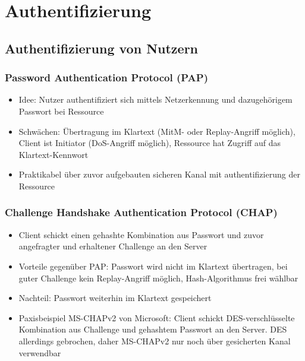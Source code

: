 \section{Authentifizierung}

\subsection{Authentifizierung von Nutzern}

\subsubsection{Password Authentication Protocol (PAP)}
\begin{itemize}
	\item Idee: Nutzer authentifiziert sich mittels Netzerkennung und dazugehörigem Passwort bei Ressource
	\item Schwächen: Übertragung im Klartext (MitM- oder Replay-Angriff möglich), Client ist Initiator (DoS-Angriff möglich), Ressource hat Zugriff auf das Klartext-Kennwort
	\item Praktikabel über zuvor aufgebauten sicheren Kanal mit authentifizierung der Ressource
\end{itemize}

\subsubsection{Challenge Handshake Authentication Protocol (CHAP)}
\begin{itemize}
	\item Client schickt einen gehashte Kombination aus Passwort und zuvor angefragter und erhaltener Challenge an den Server
	\item Vorteile gegenüber PAP: Passwort wird nicht im Klartext übertragen, bei guter Challenge kein Replay-Angriff möglich, Hash-Algorithmus frei wählbar
	\item Nachteil: Passwort weiterhin im Klartext gespeichert
	\item Paxisbeispiel MS-CHAPv2 von Microsoft: Client schickt DES-verschlüsselte Kombination aus Challenge und gehashtem Passwort an den Server. DES allerdings gebrochen, daher MS-CHAPv2 nur noch über gesicherten Kanal verwendbar
\end{itemize}

